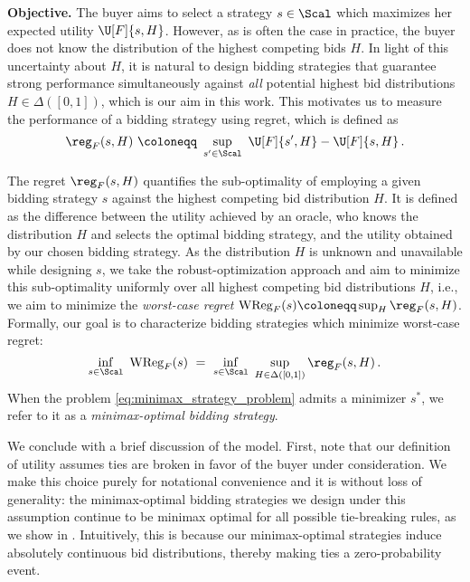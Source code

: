 \noindent \textbf{Objective.} The buyer aims to select a strategy $s \in \Scal$ which maximizes her expected utility $\U[F]{s, H}$. However, as is often the case in practice, the buyer does not know the distribution of the highest competing bids $H$. In light of this uncertainty about $H$, it is natural to design bidding strategies that guarantee strong performance simultaneously against \emph{all} potential highest bid distributions $H \in \Delta([0,1])$, which is our aim in this work. This motivates us to measure the performance of a bidding strategy using regret, which is defined as
\begin{equation}
    \label{eq:regret}
    \reg_F(s,H)\ \coloneqq\  \sup_{s' \in \Scal}\ \U[F]{s',H} - \U[F]{s,H} \,.
\end{equation}

The regret $\reg_F(s, H)$ quantifies the sub-optimality of employing a given bidding strategy $s$ against the highest competing bid distribution $H$. It is defined as the difference between the utility achieved by an oracle, who knows the distribution $H$ and selects the optimal bidding strategy, and the utility obtained by our chosen bidding strategy. As the distribution $H$ is unknown and unavailable while designing $s$, we take the robust-optimization approach and aim to minimize this sub-optimality uniformly over all highest competing bid distributions $H$, i.e., we aim to minimize the \emph{worst-case regret} $\mathrm{WReg}_F(s) \coloneqq \sup_H \reg_F(s,H)$. Formally, our goal is to characterize bidding strategies which minimize worst-case regret:
\begin{equation}
\label{eq:minimax_strategy_problem}
  \inf_{s \in \Scal}\ \mathrm{WReg}_F(s)\ =\  \inf_{s \in \Scal}\ \sup_{H \in \Delta([0,1])} \reg_F(s, H)\,.
\end{equation}
When the problem \eqref{eq:minimax_strategy_problem} admits a minimizer $s^*$, we refer to it as a \emph{minimax-optimal bidding strategy}. 


We conclude with a brief discussion of the model. First, note that our definition of utility assumes ties are broken in favor of the buyer under consideration. We make this choice purely for notational convenience and it is without loss of generality: the minimax-optimal bidding strategies we design under this assumption continue to be minimax optimal for all possible tie-breaking rules, as we show in . Intuitively, this is because our minimax-optimal strategies induce absolutely continuous bid distributions, thereby making ties a zero-probability event.

